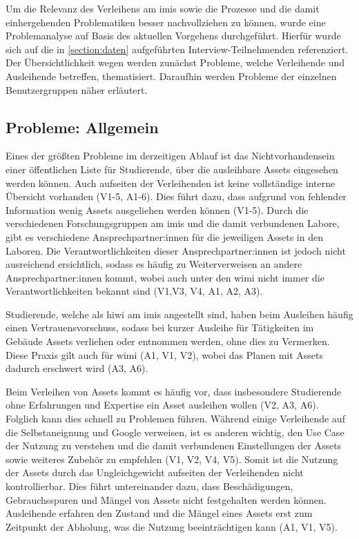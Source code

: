 Um die Relevanz des Verleihens am \ac{imis} sowie die Prozesse und die damit einhergehenden
Problematiken besser nachvollziehen zu können, wurde eine Problemanalyse auf Basis des aktuellen
Vorgehens durchgeführt. Hierfür wurde sich auf die in \ref{section:daten} aufgeführten
Interview-Teilnehmenden referenziert. Der Übersichtlichkeit wegen werden zunächst Probleme,
welche Verleihende und Ausleihende betreffen, thematisiert. Daraufhin werden Probleme der einzelnen
Benutzergruppen näher erläutert.

\subsection{Probleme: Allgemein}
\label{section:probleme-allgemein}
Eines der größten Probleme im derzeitigen Ablauf ist das Nichtvorhandensein einer öffentlichen Liste
für Studierende, über die ausleihbare Assets eingesehen werden können. Auch aufseiten der
Verleihenden ist keine vollständige interne Übersicht vorhanden (V1-5, A1-6). Dies führt dazu, dass
aufgrund von fehlender Information wenig Assets ausgeliehen werden können (V1-5). Durch die verschiedenen
Forschungsgruppen am \ac{imis} und die damit verbundenen Labore, gibt es verschiedene
Ansprechpartner:innen für die jeweiligen Assets in den Laboren. Die Verantwortlichkeiten dieser
Ansprechpartner:innen ist jedoch nicht ausreichend ersichtlich, sodass es häufig zu Weiterverweisen
an andere Ansprechpartner:innen kommt, wobei auch unter den \ac{wimi} nicht immer
die Verantwortlichkeiten bekannt sind (V1,V3, V4, A1, A2, A3).

Studierende, welche als \ac{hiwi} am \ac{imis} angestellt sind, haben beim Ausleihen häufig einen
Vertrauensvorschuss, sodass bei kurzer Ausleihe für Tätigkeiten im Gebäude Assets verliehen oder
entnommen werden, ohne dies zu Vermerken. Diese Praxis gilt auch für \ac{wimi} (A1, V1, V2), wobei
das Planen mit Assets dadurch erschwert wird (A3, A6).

Beim Verleihen von Assets kommt es häufig vor, dass insbesondere Studierende ohne Erfahrungen und
Expertise ein Asset ausleihen wollen (V2, A3, A6). Folglich kann dies schnell zu Problemen führen.
Während einige Verleihende auf die Selbstaneignung und Google verweisen, ist es anderen wichtig, den
Use Case der Nutzung zu verstehen und die damit verbundenen Einstellungen der Assets sowie weiteres
Zubehör zu empfehlen (V1, V2, V4, V5). Somit ist die Nutzung der Assets durch das Ungleichgewicht
aufseiten der Verleihenden nicht kontrollierbar. Dies führt untereinander dazu, dass Beschädigungen,
Gebrauchsspuren und Mängel von Assets nicht festgehalten werden können. Ausleihende erfahren den
Zustand und die Mängel eines Assets erst zum Zeitpunkt der Abholung, was die Nutzung beeinträchtigen
kann (A1, V1, V5).

